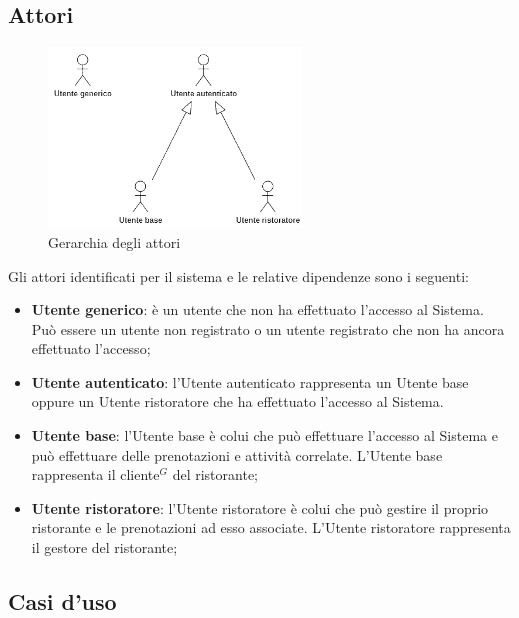 \newpage
\subsection{Attori}

\begin{figure}[h]
	\centering
	\includegraphics[width=0.6\textwidth]{./uml/gerarchia_attori.png} 
	\caption{Gerarchia degli attori}
\end{figure}

Gli attori identificati per il sistema e le relative dipendenze sono i seguenti:
\begin{itemize}
	\item \textbf{Utente generico}: è un utente che non ha effettuato l'accesso al
	      Sistema. Può essere un utente non registrato o un utente registrato che non ha
	      ancora effettuato l'accesso;

	\item \textbf{Utente autenticato}: l'Utente autenticato rappresenta un Utente
	      base oppure un Utente ristoratore che ha effettuato l'accesso al Sistema.

	\item \textbf{Utente base}: l'Utente base è colui che può effettuare l'accesso al Sistema e può
	      effettuare delle prenotazioni e attività correlate. L'Utente base rappresenta
	      il cliente$^G$ del ristorante;

	\item \textbf{Utente ristoratore}: l'Utente ristoratore è colui che può gestire il proprio ristorante e le
	      prenotazioni ad esso associate. L'Utente ristoratore rappresenta il gestore del
	      ristorante;
\end{itemize}

\newpage
\subsection{Casi d'uso}